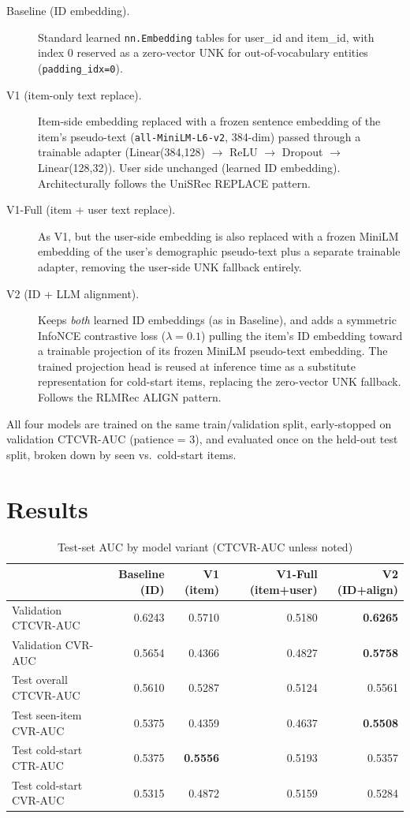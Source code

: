 \begin{description}
  \item[Baseline (ID embedding).] Standard learned \texttt{nn.Embedding} tables for user\_id and item\_id, with index 0 reserved as a zero-vector UNK for out-of-vocabulary entities (\texttt{padding\_idx=0}).
  \item[V1 (item-only text replace).] Item-side embedding replaced with a frozen sentence embedding of the item's pseudo-text (\texttt{all-MiniLM-L6-v2}, 384-dim) passed through a trainable adapter (Linear(384,128) $\to$ ReLU $\to$ Dropout $\to$ Linear(128,32)). User side unchanged (learned ID embedding). Architecturally follows the UniSRec \cite{hou2022unisrec} REPLACE pattern.
  \item[V1-Full (item + user text replace).] As V1, but the user-side embedding is also replaced with a frozen MiniLM embedding of the user's demographic pseudo-text plus a separate trainable adapter, removing the user-side UNK fallback entirely.
  \item[V2 (ID + LLM alignment).] Keeps \emph{both} learned ID embeddings (as in Baseline), and adds a symmetric InfoNCE contrastive loss ($\lambda = 0.1$) pulling the item's ID embedding toward a trainable projection of its frozen MiniLM pseudo-text embedding. The trained projection head is reused at inference time as a substitute representation for cold-start items, replacing the zero-vector UNK fallback. Follows the RLMRec \cite{ren2024rlmrec} ALIGN pattern.
\end{description}

All four models are trained on the same train/validation split, early-stopped on validation CTCVR-AUC (patience = 3), and evaluated once on the held-out test split, broken down by seen vs.\ cold-start items.

\section{Results}

\begin{table}[h]
\centering
\caption{Test-set AUC by model variant (CTCVR-AUC unless noted)}
\label{tab:main-results}
\begin{tabular}{lrrrr}
\toprule
 & Baseline (ID) & V1 (item) & V1-Full (item+user) & V2 (ID+align) \\
\midrule
Validation CTCVR-AUC        & 0.6243 & 0.5710 & 0.5180 & \textbf{0.6265} \\
Validation CVR-AUC          & 0.5654 & 0.4366 & 0.4827 & \textbf{0.5758} \\
Test overall CTCVR-AUC      & 0.5610 & 0.5287 & 0.5124 & 0.5561 \\
Test seen-item CVR-AUC      & 0.5375 & 0.4359 & 0.4637 & \textbf{0.5508} \\
Test cold-start CTR-AUC     & 0.5375 & \textbf{0.5556} & 0.5193 & 0.5357 \\
Test cold-start CVR-AUC     & 0.5315 & 0.4872 & 0.5159 & 0.5284 \\
\bottomrule
\end{tabular}
\end{table}

